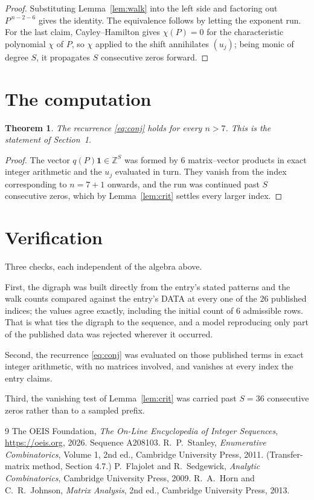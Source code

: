 \documentclass[11pt,a4paper]{article}
\theoremstyle{plain}
\newtheorem{theorem}{Theorem}
\theoremstyle{definition}
\begin{document}
\begin{proof}
Substituting Lemma~\ref{lem:walk} into the left side and factoring out
$P^{\,n-2-6}$ gives the identity. The equivalence follows by letting the exponent
run. For the last claim, Cayley--Hamilton gives $\chi(P)=0$ for the characteristic
polynomial $\chi$ of $P$, so $\chi$ applied to the shift annihilates $(u_j)$; being monic of
degree $S$, it propagates $S$ consecutive zeros forward.
\end{proof}

\section{The computation}

\begin{theorem}
The recurrence \eqref{eq:conj} holds for every $n>7$. This is the statement of
Section~1.
\end{theorem}

\begin{proof}
The vector $q(P)\mathbf{1}\in\mathbb{Z}^{S}$ was formed by $6$ matrix--vector
products in exact integer arithmetic and the $u_j$ evaluated in turn. They vanish from the
index corresponding to $n=7+1$ onwards, and the run was continued past $S$ consecutive
zeros, which by Lemma~\ref{lem:crit} settles every larger index.
\end{proof}

\section{Verification}

Three checks, each independent of the algebra above.

First, the digraph was built directly from the entry's stated patterns and the walk counts
compared against the entry's DATA at every one of the $26$ published indices; the
values agree exactly, including the initial count of $6$ admissible rows. That is
what ties the digraph to the sequence, and a model reproducing only part of the published
data was rejected wherever it occurred.

Second, the recurrence \eqref{eq:conj} was evaluated on those published terms in exact
integer arithmetic, with no matrices involved, and vanishes at every index the entry claims.

Third, the vanishing test of Lemma~\ref{lem:crit} was carried past $S=36$ consecutive
zeros rather than to a sampled prefix.

\begin{thebibliography}{9}
 The OEIS Foundation, \emph{The On-Line Encyclopedia of Integer
Sequences}, \url{https://oeis.org}, 2026. Sequence A208103.
 R.~P.~Stanley, \emph{Enumerative Combinatorics}, Volume 1, 2nd ed.,
Cambridge University Press, 2011. (Transfer-matrix method, Section 4.7.)
 P.~Flajolet and R.~Sedgewick, \emph{Analytic Combinatorics}, Cambridge
University Press, 2009.
 R.~A.~Horn and C.~R.~Johnson, \emph{Matrix Analysis}, 2nd ed., Cambridge
University Press, 2013.
\end{thebibliography}
\end{document}
